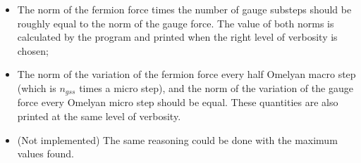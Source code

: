 \documentclass[a4paper,10pt]{book}
\begin{document}
\begin{itemize}
 \item The norm of the fermion force times the number of gauge substeps should be 
roughly equal to the norm of the gauge force. The value of both norms is calculated by 
the program and printed when the right level of verbosity is chosen;
 \item The norm of the variation of the fermion force every half Omelyan macro step 
(which is $n_{gss}$ times a micro step), and the norm of the variation of the gauge 
force every Omelyan micro step should be equal. These quantities are also printed at 
the same level of verbosity.
\item (Not implemented) The same reasoning could be done with the maximum values found.
\end{itemize}
\end{document}
